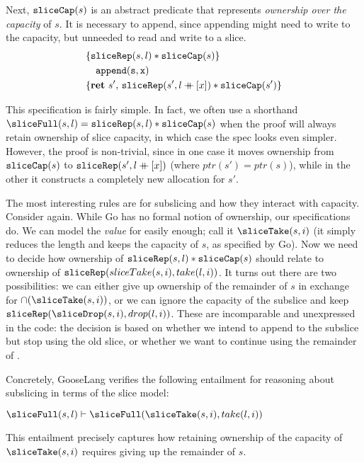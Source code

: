 Next, $\mathtt{sliceCap}(s)$ is an abstract predicate that represents
\emph{ownership over the capacity} of $s$. It is necessary to append,
since appending might need to write to the capacity, but unneeded to
read and write to a slice.
\[
\hoareV{\sliceRep(s, l) * \sliceCap(s)}%
{\mathtt{append(s, x)}}%
{\Ret{s'} \sliceRep(s', l \lappend [x]) * \sliceCap(s')}
\]


This specification is fairly simple. In fact, we often use a shorthand
$\sliceFull(s, l) = \sliceRep(s, l) * \sliceCap(s)$ when the proof will
always retain ownership of slice capacity, in which case the spec looks
even simpler. However, the proof is non-trivial, since in one case it
moves ownership from $\mathtt{sliceCap}(s)$ to $\mathtt{sliceRep}(s', l \mathbin{+\mkern-10mu+} [x])$
(where $ptr(s') = ptr(s)$), while in the other it constructs a
completely new allocation for $s'$.


The most interesting rules are for subslicing and how they interact with
capacity. Consider  again. While Go has no formal
notion of ownership, our specifications do. We can model the
\emph{value} for  easily enough; call it
$\sliceTake(s, i)$ (it simply reduces the length and keeps the capacity
of $s$, as specified by Go). Now we need to decide how ownership of
$\mathtt{sliceRep}(s, l) * \mathtt{sliceCap}(s)$ should relate to ownership of
$\mathtt{sliceRep}(sliceTake(s, i), take(l, i))$. It turns out there are two
possibilities: we can either give up ownership of the remainder of $s$
in exchange for $\cap(\sliceTake(s, i))$, or we can ignore the
capacity of the subslice and keep
$\sliceRep(\sliceDrop(s, i), drop(l, i))$. These are incomparable and
unexpressed in the code: the decision is based on whether we intend to
append to the subslice but stop using the old slice, or whether we want
to continue using the remainder of .


Concretely, GooseLang verifies the following entailment for reasoning
about subslicing in terms of the slice model:

$\sliceFull(s, l) \vdash \sliceFull(\sliceTake(s, i), take(l, i))$

This entailment precisely captures how retaining ownership of the
capacity of $\sliceTake(s, i)$ requires giving up the remainder of
$s$.

